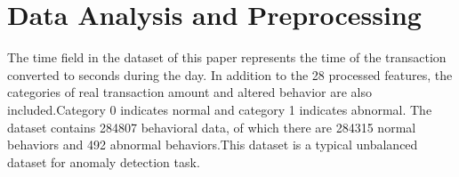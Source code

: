\section{Data Analysis and Preprocessing} \label{sec-preliminaries}
The time field in the dataset of this paper represents the time of the transaction converted to seconds during the day. In addition to the 28 processed features, the categories of real transaction amount and altered behavior are also included.Category 0 indicates normal and category 1 indicates abnormal.
The dataset contains 284807 behavioral data, of which there are 284315 normal behaviors and 492 abnormal behaviors.This dataset is a typical unbalanced dataset for anomaly detection task.

